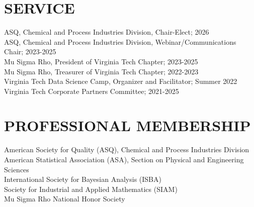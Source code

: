 \documentclass[margin,line]{res}
\begin{document}
\begin{resume}
\section{\bf SERVICE}
ASQ, Chemical and Process Industries Division, Chair-Elect; 2026 \\
ASQ, Chemical and Process Industries Division, Webinar/Communications Chair; 2023-2025 \\
Mu Sigma Rho, President of Virginia Tech Chapter; 2023-2025 \\
Mu Sigma Rho, Treasurer of Virginia Tech Chapter; 2022-2023 \\
Virginia Tech Data Science Camp, Organizer and Facilitator; Summer 2022 \\
Virginia Tech Corporate Partners Committee; 2021-2025

\vspace{-0.2cm}
\medskip
\section{\bf PROFESSIONAL MEMBERSHIP}
American Society for Quality (ASQ), Chemical and Process Industries Division \\
American Statistical Association (ASA), Section on Physical and Engineering Sciences \\
International Society for Bayesian Analysis (ISBA) \\
Society for Industrial and Applied Mathematics (SIAM) \\
Mu Sigma Rho National Honor Society

\end{resume}
\end{document}
